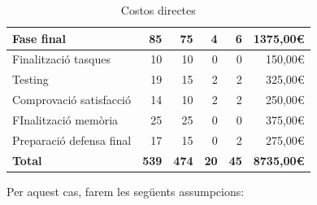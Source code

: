 \begin{table}[htb]
{\begin{tabular}{lrrrrr}
\hline
\textbf{Fase final}                          & \textbf{85}                                  & \textbf{75}                                    & \textbf{4}                               & \textbf{6}                                 & \textbf{1375,00\euro}                              \\
\hline
Finalització tasques                         & 10                                           & 10                                             & 0                                        & 0                                          & 150,00\euro                                        \\
Testing                                      & 19                                           & 15                                             & 2                                        & 2                                          & 325,00\euro                                        \\
Comprovació satisfacció                      & 14                                           & 10                                             & 2                                        & 2                                          & 250,00\euro                                        \\
FInalització memòria                         & 25                                           & 25                                             & 0                                        & 0                                          & 375,00\euro                                        \\
Preparació defensa final                     & 17                                           & 15                                             & 0                                        & 2                                          & 275,00\euro                                        \\
\hline
\textbf{Total}                               & \textbf{539}                                 & \textbf{474}                                   & \textbf{20}                              & \textbf{45}                                & \textbf{8735,00\euro}       \\
\hline                      
\end{tabular}}
\caption{Costos directes}
\end{table}

Per aquest cas, farem les següents assumpcions:

